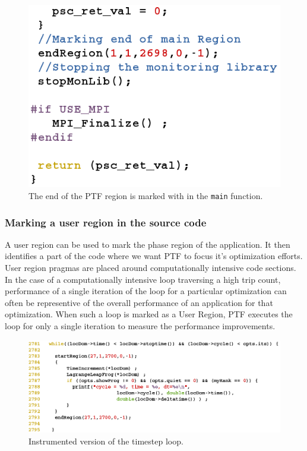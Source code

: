 	\begin{figure}[H]
		\centering
		\includegraphics[scale=0.6]{../BPG/images/uc3_end_main_region.png}
		\caption{The end of the PTF region is marked with in the {\tt main} function.}
		\label{fig:uc3_end_main_region}		
	\end{figure}

\subsubsection{Marking a user region in the source code }

A user region can be used to mark the phase region of the application. It then identifies a part of the code where we want PTF to focus it's optimization efforts. User region pragmas are placed around computationally intensive code sections. In the case of a computationally intensive loop traversing a high trip count, performance of a single iteration of the loop for a particular optimization can often be representive of the overall performance of an application for that optimization. When such a loop is marked as a User Region, PTF executes the loop for only a single iteration to measure the performance improvements.
	
	\begin{figure}[H]
		\includegraphics[width=\textwidth]{../BPG/images/uc3_instrumented_loop.png}
		\caption{Instrumented version of the timestep loop.}
		\label{fig:uc3_instrumented_loop}
	\end{figure}


